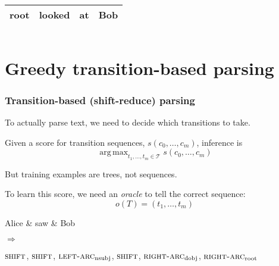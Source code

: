 \documentclass[t]{beamer}
\DeclareMathOperator*{\argmax}{arg\,max}
\begin{document}
\begin{frame}
{\begin{varwidth}{2.2\linewidth}
{\begin{dependency}
\begin{deptext}[column sep=.7cm]
	\end{deptext}
	\end{dependency}
	\\
	\begin{tabular}{|l|l|l|l|}\hline
	\color{red} root & \color{red} looked & \color{red} at & \color{red} Bob \\ \hline
	\end{tabular}
	\hspace{6mm}
	\begin{tabular}{|l|}\hline
	\quad \\ \hline
	\end{tabular}
	}
    \end{varwidth}
	}
\end{frame}

\section{Greedy transition-based parsing}

\begin{frame}
  \frametitle{Transition-based (shift-reduce) parsing}
    To actually parse text, we need to decide which transitions to take.
    
    Given a score for transition sequences, $s(c_0, \ldots, c_m)$,
    inference is
    \[
    \argmax_{t_1,\ldots,t_m \in \mathcal{T}} s(c_0, \ldots, c_m)
    \]

    But training examples are trees, not sequences.
    
    To learn this score, we need an \textit{oracle} to tell the correct sequence:
    \[
    o(T)=(t_1,\ldots,t_m)
    \]
    
    \pause\vfill
    
    \begin{minipage}{.5\textwidth}
	\begin{dependency}
	\begin{deptext}[column sep=.7cm]
	Alice \& saw \& Bob \\
	\end{deptext}
	\end{dependency}
	\end{minipage}
    \begin{minipage}{.1\textwidth}
	$\Rightarrow$
	\end{minipage}
    \begin{minipage}{.2\textwidth}
    $\textsc{shift}$,
	$\textsc{shift}$,
	$\textsc{left-arc}_\mathrm{nsubj}$,
	$\textsc{shift}$,
	$\textsc{right-arc}_\mathrm{dobj}$,
	$\textsc{right-arc}_\mathrm{root}$
	\end{minipage}
\end{frame}
\end{document}
